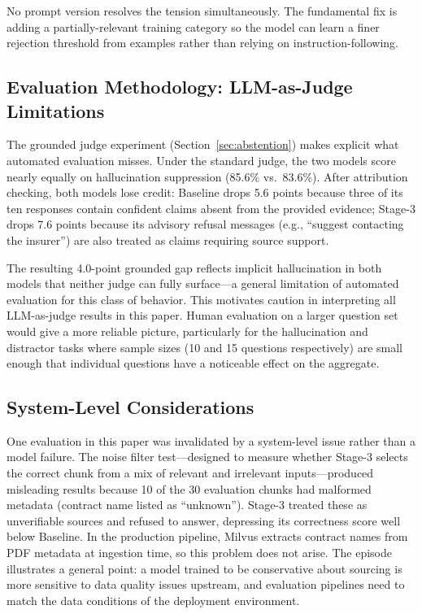 \documentclass[10pt,conference]{IEEEtran}
\begin{document}
No prompt version resolves the tension simultaneously.
The fundamental fix is adding a partially-relevant training category so
the model can learn a finer rejection threshold from examples rather than
relying on instruction-following.

\subsection{Evaluation Methodology: LLM-as-Judge Limitations}

The grounded judge experiment (Section~\ref{sec:abstention}) makes explicit
what automated evaluation misses.
Under the standard judge, the two models score nearly equally on hallucination
suppression (85.6\% vs.\ 83.6\%).
After attribution checking, both models lose credit: Baseline drops 5.6 points
because three of its ten responses contain confident claims absent from the
provided evidence; Stage-3 drops 7.6 points because its advisory refusal
messages (e.g., ``suggest contacting the insurer'') are also treated as claims
requiring source support.

The resulting 4.0-point grounded gap reflects implicit hallucination in both
models that neither judge can fully surface---a general limitation of automated
evaluation for this class of behavior.
This motivates caution in interpreting all LLM-as-judge results
in this paper.
Human evaluation on a larger question set would give a more reliable picture,
particularly for the hallucination and distractor tasks where sample sizes
(10 and 15 questions respectively) are small enough that individual questions
have a noticeable effect on the aggregate.

\subsection{System-Level Considerations}

One evaluation in this paper was invalidated by a system-level issue rather
than a model failure.
The noise filter test---designed to measure whether Stage-3 selects the correct
chunk from a mix of relevant and irrelevant inputs---produced misleading results
because 10 of the 30 evaluation chunks had malformed metadata (contract name
listed as ``unknown'').
Stage-3 treated these as unverifiable sources and refused to answer, depressing
its correctness score well below Baseline.
In the production pipeline, Milvus extracts contract names from PDF metadata at
ingestion time, so this problem does not arise.
The episode illustrates a general point: a model trained to be conservative
about sourcing is more sensitive to data quality issues upstream, and
evaluation pipelines need to match the data conditions of the deployment
environment.
\end{document}
